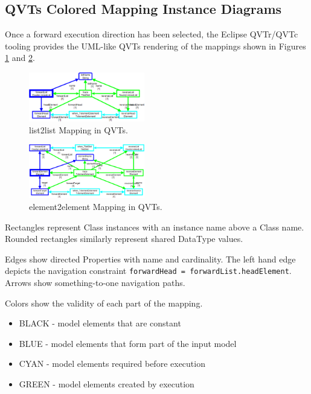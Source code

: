\documentclass[conference]{IEEEtran}
\begin{document}
\subsection{QVTs Colored Mapping Instance Diagrams}

Once a forward execution direction has been selected, the Eclipse QVTr/QVTc tooling provides the UML-like QVTs rendering of the mappings shown in Figures \ref{fig:List2List-QVTs} and \ref{fig:Element2Element-QVTs}.

\begin{figure}[h]
	\centering
	\includegraphics[width=0.45\textwidth]{List2List-QVTs.png}
	\caption{list2list Mapping in QVTs.}
	\label{fig:List2List-QVTs}
\end{figure}

\begin{figure}[h]
	\centering
	\includegraphics[width=0.45\textwidth]{Element2Element-QVTs.png}
	\caption{element2element Mapping in QVTs.}
	\label{fig:Element2Element-QVTs}
\end{figure}

Rectangles represent Class instances with an instance name above a Class name. Rounded rectangles similarly represent shared DataType values.

Edges show directed Properties with  name and cardinality. The left hand edge depicts the navigation constraint \verb|forwardHead = forwardList.headElement|. Arrows show something-to-one navigation paths.

Colors show the validity of each part of the mapping.

\begin{itemize}
\item BLACK - model elements that are constant
\item BLUE - model elements that form part of the input model
\item CYAN - model elements required before execution
\item GREEN - model elements created by execution
\end{itemize} 
\end{document}
